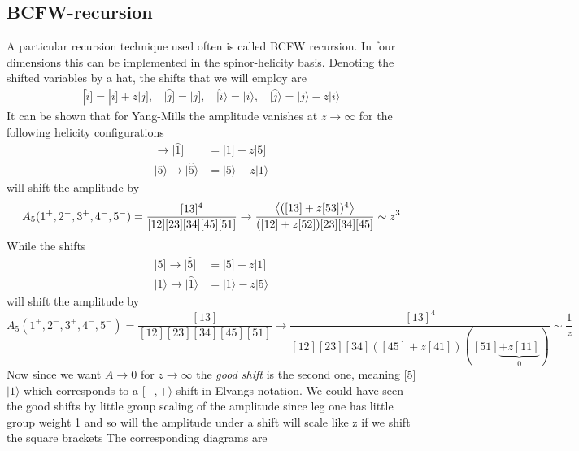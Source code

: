 \documentclass[a4paper,12pt]{article}
\begin{document}
\subsection{BCFW-recursion}
%
A particular recursion technique used often is called BCFW recursion. In four dimensions this can be implemented in the spinor-helicity basis. Denoting the shifted variables by a hat, the shifts that we will employ are
\begin{equation}
\begin{aligned}
|\hat i]=|i]+z|j],~~~~|\hat j]=|j],~~~~|\hat i \rangle = | i \rangle,~~~~|\hat j \rangle =|j\rangle-z|i\rangle
\end{aligned}
\end{equation}
%
It can be shown that for Yang-Mills the amplitude vanishes at $z\to \infty$ for the following helicity configurations
%
\begin{align}
[i,j\rangle&~~[-,-\rangle~~[-,+\rangle~~[+,+\rangle~~[+,-\rangle\\
A_n(z)&\sim ~~\frac{1}{z}~~~~~~~\frac{1}{z}~~~~~~~~\frac{1}{z}~~~~~~~~z^3
\end{align}
%
The first 3 types of shifts will be referred to as \textit{good shifts}.
\subsection{Example of BCFW-recursion}
%
As an example, let us calculate the amplitude $A_5(1_g^+,2_g^-,3_g^+,4_g^-,5_g^-)$
Since we are dealing with an $\overline{\text{MHV}}$ amplitude we can immediately read of the good shift since the shifts
\begin{align}
|1]\to|\hat{1}]&=|1]+z|5]\\
|5\rangle\to|\hat{5}\rangle&=|5\rangle-z|1\rangle
\end{align}
will shift the amplitude by
\[
A_{5}(1^+,2^-,3^+,4^-,5^-)=\frac{[13]^4}{[12][23][34][45][51]}\to \frac{\expval{([13]+z[53])^4}}{([12]+z[52])[23][34][45]}\sim z^3
\]
While the shifts
\begin{align}
|5]\to|\hat{5}]&=|5]+z|1]\\
|1\rangle\to|\hat{1}\rangle&=|1\rangle-z|5\rangle
\end{align}
will shift the amplitude by
\[
A_{5}(1^+,2^-,3^+,4^-,5^-)=\frac{[13]}{[12][23][34][45][51]}\to \frac{[13]^4}{[12][23][34]([45]+z[41])([51]\underbrace{+z[11]}_{0})}\sim \frac{1}{z}
\]
Now since we want $A\to 0$ for $z\to \infty$ the \textit{good shift} is the second one, meaning [5] $|1\rangle$ which corresponds to a $[-,+\rangle$ shift in Elvangs notation.
%
We could have seen the good shifts by little group scaling of the amplitude since leg one has little group weight 1 and so will the amplitude under a shift will scale like z if we shift the square brackets
 The corresponding diagrams are
\end{document}
